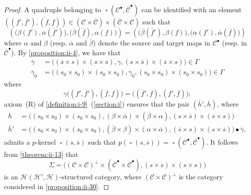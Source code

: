 \documentclass[a4paper,fleqn]{article}
\theoremstyle{plain}
\theoremstyle{definition}
\newcommand{\CC}{\mathcal{C}}
\newcommand{\HH}{\mathcal{H}}
\DeclareMathOperator{\sq}{\square}
\newcommand{\smallbullet}{\bullet}
\begin{document}
\begin{proof}
  A quadruple belonging to $\sq(\CC^\smallbullet,\overline{\CC}^\smallbullet)$ can be identified with an element $((f',\overline{f}'),(\overline{f},f))\in(\CC\times\overline{\CC})\times(\overline{\CC}\times\CC)$ such that
  \[
    \left(
      \big(\beta(f'),\overline{\alpha}(\overline{f}')\big),
      \big(\overline{\beta}(\overline{f}),\alpha(f)\big)
    \right)
    =
    \left(
      \big(\overline{\beta}(\overline{f}'),\beta(f)\big),
      \big(\alpha(f'),\overline{\alpha}(\overline{f})\big)
    \right)
  \]
  where $\alpha$ and $\beta$ (resp. $\overline{\alpha}$ and $\overline{\beta}$) denote the source and target maps in $\CC^\smallbullet$ (resp. in $\overline{\CC}^\smallbullet$).
  By \cref{proposition:ii-4}, we have that
  \[
    \begin{aligned}
      \overline{\gamma}
      &= \big(
        (\overline{s}\times s)\times(s\times\overline{s}),
        \gamma,
        (s\times\overline{s})\times(\overline{s}\times s)
      \big)
      \in\Gamma
    \\\overline{\gamma}_0
      &= \big(
        (s_0\times s_0)\times(s_0\times s_0),
        \gamma_0,
        (s_0\times s_0)\times(s_0\times s_0)
      \big)
      \in\Gamma
    \end{aligned}
  \]
  where
  \[
    \gamma\big((f',\overline{f}'),(\overline{f},f)\big)
    = \big((\overline{f}',f),(f',\overline{f})\big);
  \]
  axiom~(R) of \cref{definition:i-9}~(\cref{section:i}) ensures that the pair $(\overline{h}',\overline{h})$, where
  \[
    \begin{aligned}
      \overline{h}
      &= \big(
        (s_0\times s_0)\times(s_0\times s_0),
        (\beta\times\overline{\alpha})\times(\overline{\beta}\times\alpha),
        (s\times\overline{s})\times(\overline{s}\times s)
      \big)
    \\\overline{h}'
      &= \big(
        (s_0\times s_0)\times(s_0\times s_0),
        (\overline{\beta}\times\beta)\times(\alpha\times\overline{\alpha}),
        (\overline{s}\times s)\times(s\times\overline{s})
      \big)\smallbullet\overline{\gamma},
    \end{aligned}
  \]
  admits a $p$-kernel $\sq(s,\overline{s})$ such that $p(\sq(s,\overline{s}))=\sq(\CC^\smallbullet,\overline{\CC}^\smallbullet)$.
  It follows from \cref{theorem:ii-13} that
  \[
    \Sigma
    = \big(
      (\CC\times\CC)^\perp\times(\overline{\CC}^\smallbullet\times\overline{\CC}^\smallbullet),
      (s\times s)\times(s\times s)
    \big)
  \]
  is an $\HH(\HH',\HH)$-structured category, where $(\CC\times\CC)^\perp$ is the category considered in \cref{proposition:ii-30}.

\end{proof}
\end{document}
